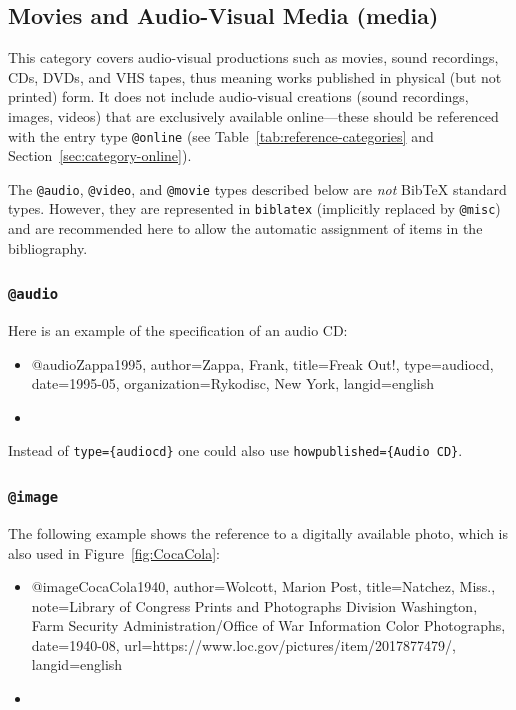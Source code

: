 \subsection{Movies and Audio-Visual Media (\textsf{media})}
\label{sec:category-avmedia}

This category covers audio-visual productions such as movies, sound recordings,
CDs, DVDs, and VHS tapes, thus meaning works published in physical (but not
printed) form. It does not include audio-visual creations (sound recordings,
images, videos) that are exclusively available online---these should be
referenced with the entry type \texttt{@online} (see
Table~\ref{tab:reference-categories} and Section~\ref{sec:category-online}).

The \texttt{@audio}, \texttt{@video}, and \texttt{@movie} types described below
are \emph{not} BibTeX standard types. However, they are represented in
\texttt{biblatex} (implicitly replaced by \texttt{@misc}) and are recommended
here to allow the automatic assignment of items in the bibliography.

\subsubsection{\texttt{\bfseries @audio}}
\label{sec:@audio}
Here is an example of the specification of an audio CD:
%
\begin{itemize}
\item[]
\begin{GenericCode}[numbers=none]
@audio{Zappa1995,
  author={Zappa, Frank},
  title={Freak Out!},
  type={audiocd},
  date={1995-05},
  organization={Rykodisc, New York},
  langid={english}
}
\end{GenericCode}
\item[\cite{Zappa1995}] 
\end{itemize}
%
Instead of \verb!type={audiocd}! one could also use \verb!howpublished={Audio CD}!.

\subsubsection{\texttt{\bfseries @image}}
\label{sec:@image}

The following example shows the reference to a digitally available photo, which
is also used in Figure~\ref{fig:CocaCola}:
%
\begin{itemize}
\item[]
\begin{GenericCode}[numbers=none]
@image{CocaCola1940,
  author={Wolcott, Marion Post},
  title={Natchez, Miss.},
  note={Library of Congress Prints and Photographs Division Washington, Farm Security Administration/Office of War Information Color Photographs},
  date={1940-08},
  url={https://www.loc.gov/pictures/item/2017877479/},
  langid={english}
}
\end{GenericCode}
\item[\cite{CocaCola1940}] 
\end{itemize}


